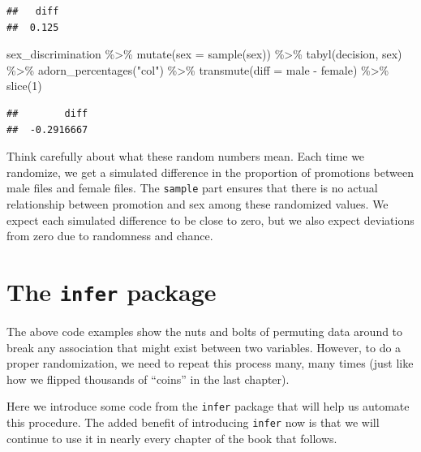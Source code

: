 \documentclass[
]{book}
\newenvironment{Shaded}{\begin{snugshade}}{\end{snugshade}}
\newcommand{\AttributeTok}[1]{\textcolor[rgb]{0.77,0.63,0.00}{#1}}
\newcommand{\DecValTok}[1]{\textcolor[rgb]{0.00,0.00,0.81}{#1}}
\newcommand{\FunctionTok}[1]{\textcolor[rgb]{0.00,0.00,0.00}{#1}}
\newcommand{\NormalTok}[1]{#1}
\newcommand{\SpecialCharTok}[1]{\textcolor[rgb]{0.00,0.00,0.00}{#1}}
\newcommand{\StringTok}[1]{\textcolor[rgb]{0.31,0.60,0.02}{#1}}
\begin{document}
\begin{verbatim}
##   diff
##  0.125
\end{verbatim}

\begin{Shaded}
\begin{Highlighting}[]
\NormalTok{sex\_discrimination }\SpecialCharTok{\%\textgreater{}\%}
    \FunctionTok{mutate}\NormalTok{(}\AttributeTok{sex =} \FunctionTok{sample}\NormalTok{(sex)) }\SpecialCharTok{\%\textgreater{}\%}
    \FunctionTok{tabyl}\NormalTok{(decision, sex) }\SpecialCharTok{\%\textgreater{}\%}
    \FunctionTok{adorn\_percentages}\NormalTok{(}\StringTok{"col"}\NormalTok{) }\SpecialCharTok{\%\textgreater{}\%}
    \FunctionTok{transmute}\NormalTok{(}\AttributeTok{diff =}\NormalTok{ male }\SpecialCharTok{{-}}\NormalTok{ female) }\SpecialCharTok{\%\textgreater{}\%}
    \FunctionTok{slice}\NormalTok{(}\DecValTok{1}\NormalTok{)}
\end{Highlighting}
\end{Shaded}

\begin{verbatim}
##        diff
##  -0.2916667
\end{verbatim}

Think carefully about what these random numbers mean. Each time we randomize, we get a simulated difference in the proportion of promotions between male files and female files. The \texttt{sample} part ensures that there is no actual relationship between promotion and sex among these randomized values. We expect each simulated difference to be close to zero, but we also expect deviations from zero due to randomness and chance.

\hypertarget{randomization2-infer}{%
\section{\texorpdfstring{The \texttt{infer} package}{The infer package}}\label{randomization2-infer}}

The above code examples show the nuts and bolts of permuting data around to break any association that might exist between two variables. However, to do a proper randomization, we need to repeat this process many, many times (just like how we flipped thousands of ``coins'' in the last chapter).

Here we introduce some code from the \texttt{infer} package that will help us automate this procedure. The added benefit of introducing \texttt{infer} now is that we will continue to use it in nearly every chapter of the book that follows.
\end{document}

